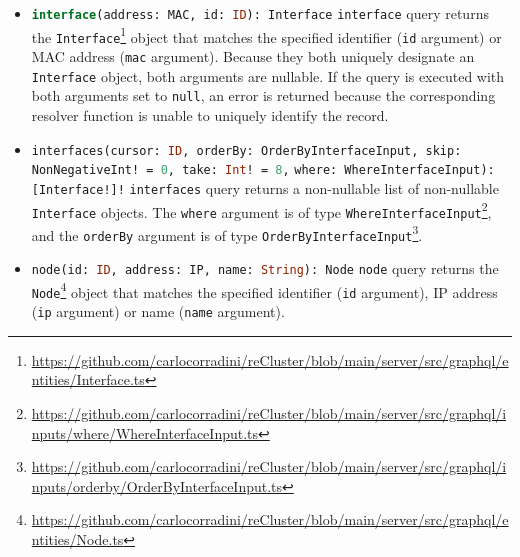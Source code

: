 \begin{itemize}
  \item \lstinline[language=graphql, morekeywords={[2]{MAC, Interface}}, morekeywords={[4]{address, id}},
    morekeywords={[5]{interface}}]{interface(address: MAC, id: ID): Interface}
    \newline
    \texttt{interface} query returns the \texttt{Interface}\footnote{\url{https://github.com/carlocorradini/reCluster/blob/main/server/src/graphql/entities/Interface.ts}}
    object that matches the specified identifier (\texttt{id} argument) or MAC address
    (\texttt{mac} argument).
    \newline
    Because they both uniquely designate an \texttt{Interface} object, both arguments
    are nullable. If the query is executed with both arguments set to \texttt{null},
    an error is returned because the corresponding resolver function is unable
    to uniquely identify the record.

  \item \lstinline[language=graphql, morekeywords={[2]{Interface, OrderByInterfaceInput, NonNegativeInt, WhereInterfaceInput}},
    morekeywords={[4]{cursor, orderBy, skip, take, where}}, morekeywords={[5]{interfaces}}]{interfaces(cursor: ID, orderBy: OrderByInterfaceInput, skip: NonNegativeInt! = 0, take: Int! = 8,}
    \hphantom{----------------}\lstinline[language=graphql, morekeywords={[2]{Interface, OrderByInterfaceInput, NonNegativeInt, WhereInterfaceInput}},
    morekeywords={[4]{cursor, orderBy, skip, take, where}}, morekeywords={[5]{interfaces}}]{where: WhereInterfaceInput): [Interface!]!}
    \newline
    \texttt{interfaces} query returns a non-nullable list of non-nullable \texttt{Interface}
    objects.
    \newline
    The \texttt{where} argument is of type \texttt{WhereInterfaceInput}\footnote{\url{https://github.com/carlocorradini/reCluster/blob/main/server/src/graphql/inputs/where/WhereInterfaceInput.ts}},
    and the \texttt{orderBy} argument is of type \texttt{OrderByInterfaceInput}\footnote{\url{https://github.com/carlocorradini/reCluster/blob/main/server/src/graphql/inputs/orderby/OrderByInterfaceInput.ts}}.

  \item \lstinline[language=graphql, morekeywords={[2]{Node, IP}}, morekeywords={[4]{address, id, name}},
    morekeywords={[5]{node}}]{node(id: ID, address: IP, name: String): Node}
    \newline
    \texttt{node} query returns the \texttt{Node}\footnote{\url{https://github.com/carlocorradini/reCluster/blob/main/server/src/graphql/entities/Node.ts}}
    object that matches the specified identifier (\texttt{id} argument), IP
    address (\texttt{ip} argument) or name (\texttt{name} argument).


\end{itemize}
